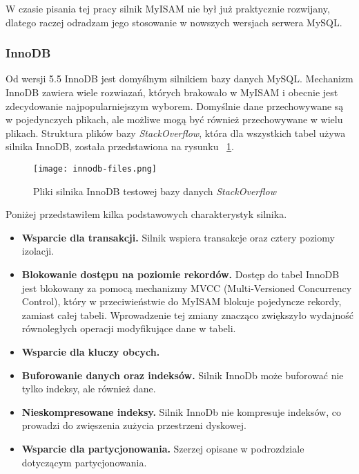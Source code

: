W czasie pisania tej pracy silnik MyISAM nie był już praktycznie rozwijany, dlatego raczej odradzam jego stosowanie w nowszych wersjach serwera MySQL. 

\subsubsection{InnoDB}
Od wersji 5.5 InnoDB jest domyślnym silnikiem bazy danych MySQL. Mechanizm InnoDB zawiera wiele rozwiazań, których brakowało w MyISAM i obecnie jest zdecydowanie najpopularniejszym wyborem. Domyślnie dane przechowywane są w pojedynczych plikach, ale możliwe mogą być również przechowywane w wielu plikach. Struktura plików bazy \textit{StackOverflow}, która dla wszystkich tabel używa silnika InnoDB, została przedstawiona na rysunku ~\ref{fig:innodb-fileslabel}.
\begin{figure}
	\caption{Pliki silnika InnoDB testowej bazy danych \textit{StackOverflow}}
	\centering
	\texttt{[image: innodb-files.png]}
	\label{fig:innodb-fileslabel}
\end{figure}
Poniżej przedstawiłem kilka podstawowych charakterystyk silnika.
\begin{itemize}
	\item \textbf{Wsparcie dla transakcji.} Silnik wspiera transakcje oraz cztery poziomy izolacji.
	\item \textbf{Blokowanie dostępu na poziomie rekordów. } Dostęp do tabel InnoDB jest blokowany za pomocą mechanizmy MVCC (Multi-Versioned Concurrency Control), który w przeciwieństwie do MyISAM blokuje pojedyncze rekordy, zamiast całej tabeli. Wprowadzenie tej zmiany znacząco zwiększyło wydajność równoległych operacji modyfikujące dane w tabeli.
	\item \textbf{Wsparcie dla kluczy obcych.}
	\item \textbf{Buforowanie danych oraz indeksów.} Silnik InnoDb może buforować nie tylko indeksy, ale również dane.
	\item  \textbf{Nieskompresowane indeksy.} Silnik InnoDb nie kompresuje indeksów, co prowadzi do zwięszenia zużycia przestrzeni dyskowej.
	\item \textbf{Wsparcie dla partycjonowania.} Szerzej opisane w podrozdziale dotyczącym partycjonowania.
\end{itemize}

